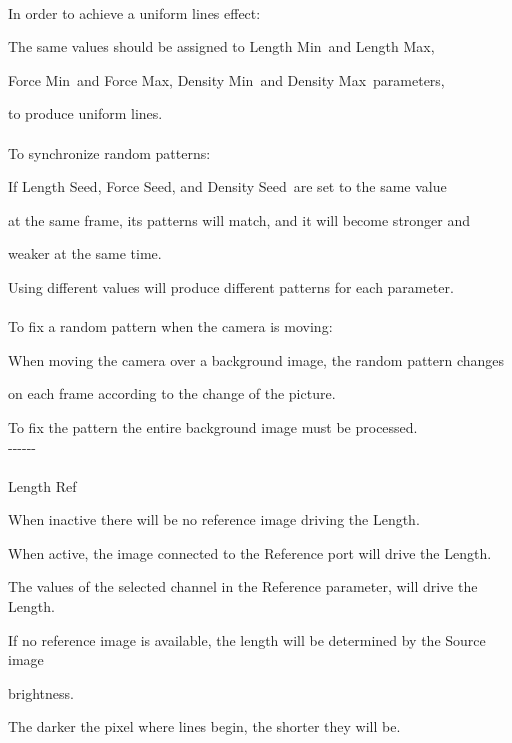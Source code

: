 \documentclass[a4paper,12pt]{article}
\begin{document}
\newpage

\thispagestyle{empty}

\ \vspace{-0.2em}
\\
In order to achieve a uniform lines effect:\par
The same values should be assigned to \textquotedbl Length Min\textquotedbl \ and \textquotedbl Length Max\textquotedbl ,\par
\textquotedbl Force Min\textquotedbl \ and \textquotedbl Force Max\textquotedbl ,
\textquotedbl Density Min\textquotedbl \ and \textquotedbl Density Max\textquotedbl \ parameters,\par 
to produce uniform lines.\\
\\
To synchronize random patterns:\par
If \textquotedbl Length Seed\textquotedbl , \textquotedbl Force Seed\textquotedbl , and \textquotedbl Density Seed\textquotedbl \ are set to the same value\par 
at the same frame, its patterns will match, and it will become stronger and\par 
weaker at the same time.\par
Using different values will produce different patterns for each parameter.\\
\\
To fix a random pattern when the camera is moving:\par
When moving the camera over a background image, the random pattern changes\par 
on each frame according to the change of the picture.\par
To fix the pattern the entire background image must be processed.\\
-{-}-{-}-{-}\\
\\
Length Ref\par
When inactive there will be no reference image driving the Length.\par
When active, the image connected to the Reference port will drive the Length.\par
The values of the selected channel in the Reference parameter, will drive the Length.\par
If no reference image is available, the length will be determined by the Source image\par 
brightness.\par
The darker the pixel where lines begin, the shorter they will be.\par
\end{document}
